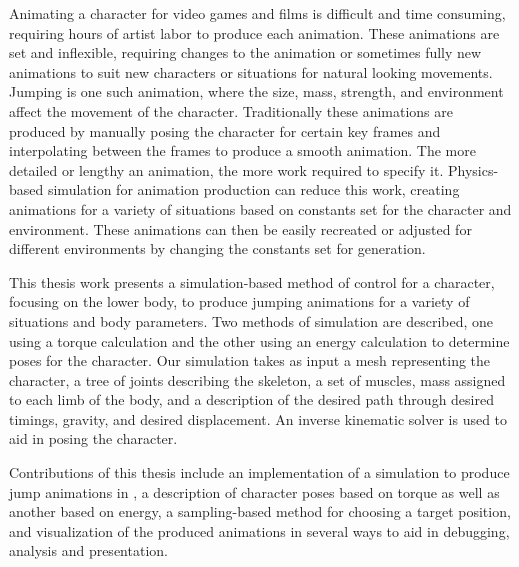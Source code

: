 
Animating a character for video games and films is difficult and time consuming, requiring hours of artist labor to produce each animation.  These animations are set and inflexible, requiring changes to the animation or sometimes fully new animations to suit new characters or situations for natural looking movements.  Jumping is one such animation, where the size, mass, strength, and environment affect the movement of the character.  Traditionally these animations are produced by manually posing the character for certain key frames and interpolating between the frames to produce a smooth animation.  The more detailed or lengthy an animation, the more work required to specify it.  Physics-based simulation for animation production can reduce this work, creating animations for a variety of situations based on constants set for the character and environment.  These animations can then be easily recreated or adjusted for different environments by changing the constants set for generation.

This thesis work presents a simulation-based method of control for a character, focusing on the lower body, to produce jumping animations for a variety of situations and body parameters.  Two methods of simulation are described, one using a torque calculation and the other using an energy calculation to determine poses for the character.  Our simulation takes as input a mesh representing the character, a tree of joints describing the skeleton, a set of muscles, mass assigned to each limb of the body, and a description of the desired path through desired timings, gravity, and desired displacement.  An inverse kinematic solver is used to aid in posing the character.

Contributions of this thesis include an implementation of a simulation to produce jump animations in \unity{}, a description of character poses based on torque as well as another based on energy, a sampling-based method for choosing a target position, and visualization of the produced animations in several ways to aid in debugging, analysis and presentation.

